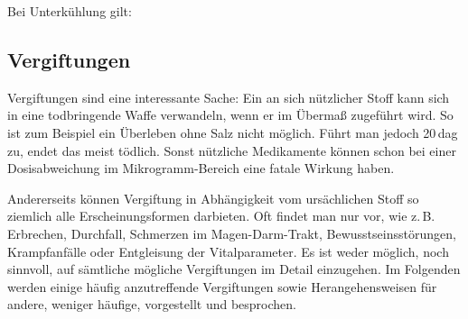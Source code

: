 {



Bei Unterkühlung gilt:






\clearpage %
\subsection {Vergiftungen}
\label{topic:vergiftung}





Vergiftungen sind eine interessante Sache: Ein an sich
nützlicher Stoff kann sich in eine todbringende Waffe
verwandeln, wenn er im Übermaß zugeführt wird. So ist zum
Beispiel ein Überleben ohne Salz nicht möglich. Führt man
jedoch 20\,dag zu, endet das meist tödlich. Sonst nützliche
Medikamente können schon bei einer Dosisabweichung im
Mikrogramm-Bereich eine fatale Wirkung haben.

Andererseits können Vergiftung in Abhängigkeit vom
ursächlichen Stoff so ziemlich alle Erscheinungsformen
darbieten. Oft findet man nur 
vor, wie z.\,B. Erbrechen, Durchfall, Schmerzen im
Magen-Darm-Trakt, Bewusstseinsstörungen, Krampfanfälle oder
Entgleisung der Vitalparameter.
Es ist weder möglich, noch sinnvoll, auf sämtliche mögliche
Vergiftungen im Detail einzugehen. Im Folgenden werden
einige häufig anzutreffende Vergiftungen sowie
Herangehensweisen für andere, weniger häufige, vorgestellt
und besprochen. 





}
